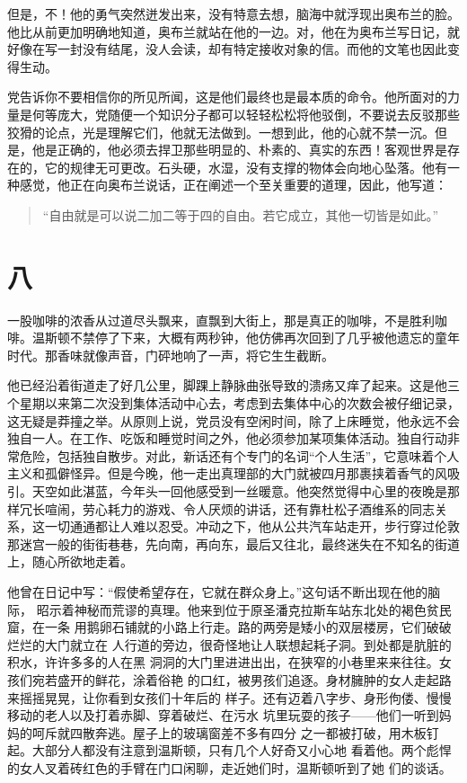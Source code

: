 但是，不！他的勇气突然迸发出来，没有特意去想，脑海中就浮现出奥布兰的脸。他比从前更加明确地知道，奥布兰就站在他的一边。对，他在为奥布兰写日记，就好像在写一封没有结尾，没人会读，却有特定接收对象的信。而他的文笔也因此变得生动。

党告诉你不要相信你的所见所闻，这是他们最终也是最本质的命令。他所面对的力量是何等庞大，党随便一个知识分子都可以轻轻松松将他驳倒，不要说去反驳那些狡猾的论点，光是理解它们，他就无法做到。一想到此，他的心就不禁一沉。但是，他是正确的，他必须去捍卫那些明显的、朴素的、真实的东西！客观世界是存在的，它的规律无可更改。石头硬，水湿，没有支撑的物体会向地心坠落。他有一种感觉，他正在向奥布兰说话，正在阐述一个至关重要的道理，因此，他写道：

\begin{quotation}
  ``自由就是可以说二加二等于四的自由。若它成立，其他一切皆是如此。''
\end{quotation}

\section*{八}\label{ux516b}

一股咖啡的浓香从过道尽头飘来，直飘到大街上，那是真正的咖啡，不是胜利咖啡。温斯顿不禁停了下来，大概有两秒钟，他仿佛再次回到了几乎被他遗忘的童年时代。那香味就像声音，门砰地响了一声，将它生生截断。

他已经沿着街道走了好几公里，脚踝上静脉曲张导致的溃疡又痒了起来。这是他三个星期以来第二次没到集体活动中心去，考虑到去集体中心的次数会被仔细记录，这无疑是莽撞之举。从原则上说，党员没有空闲时间，除了上床睡觉，他永远不会独自一人。在工作、吃饭和睡觉时间之外，他必须参加某项集体活动。独自行动非常危险，包括独自散步。对此，新话还有个专门的名词``个人生活''，它意味着个人主义和孤僻怪异。但是今晚，他一走出真理部的大门就被四月那裹挟着香气的风吸引。天空如此湛蓝，今年头一回他感受到一丝暖意。他突然觉得中心里的夜晚是那样冗长喧闹，劳心耗力的游戏、令人厌烦的讲话，还有靠杜松子酒维系的同志关系，这一切通通都让人难以忍受。冲动之下，他从公共汽车站走开，步行穿过伦敦那迷宫一般的街街巷巷，先向南，再向东，最后又往北，最终迷失在不知名的街道上，随心所欲地走着。

他曾在日记中写：``假使希望存在，它就在群众身上。''这句话不断出现在他的脑际，
昭示着神秘而荒谬的真理。他来到位于原圣潘克拉斯车站东北处的褐色贫民窟，在一条
用鹅卵石铺就的小路上行走。路的两旁是矮小的双层楼房，它们破破烂烂的大门就立在
人行道的旁边，很奇怪地让人联想起耗子洞。到处都是肮脏的积水，许许多多的人在黑
洞洞的大门里进进出出，在狭窄的小巷里来来往往。女孩们宛若盛开的鲜花，涂着俗艳
的口红，被男孩们追逐。身材臃肿的女人走起路来摇摇晃晃，让你看到女孩们十年后的
样子。还有迈着八字步、身形佝偻、慢慢移动的老人以及打着赤脚、穿着破烂、在污水
坑里玩耍的孩子——他们一听到妈妈的呵斥就四散奔逃。屋子上的玻璃窗差不多有四分
之一都被打破，用木板钉起。大部分人都没有注意到温斯顿，只有几个人好奇又小心地
看着他。两个彪悍的女人叉着砖红色的手臂在门口闲聊，走近她们时，温斯顿听到了她
们的谈话。

